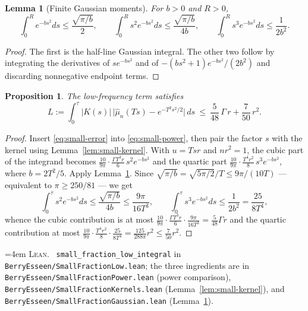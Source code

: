 \documentclass[10pt,a4paper]{article}
\theoremstyle{plain}
\newtheorem{proposition}[theorem]{Proposition}
\newtheorem{lemma}[theorem]{Lemma}
\theoremstyle{definition}
\newcommand{\lean}[1]{\texttt{#1}}
\newcommand{\file}[1]{\texttt{#1}}
\newenvironment{leanref}%
  {\par\addvspace{3pt}\begingroup\sloppy\emergencystretch=4em
   \noindent\footnotesize\textsc{Lean.}\ \ignorespaces}%
  {\par\endgroup\addvspace{3pt}}
\begin{document}
\begin{lemma}[Finite Gaussian moments]\label{lem:gauss-moments}
For $b>0$ and $R>0$,
\[
  \int_0^R e^{-bs^2}ds \le \frac{\sqrt{\pi/b}}{2},
  \qquad
  \int_0^R s^2e^{-bs^2}ds \le \frac{\sqrt{\pi/b}}{4b},
  \qquad
  \int_0^R s^3e^{-bs^2}ds \le \frac{1}{2b^2}.
\]
\end{lemma}

\begin{proof}
The first is the half-line Gaussian integral. The other two follow by
integrating the derivatives of $se^{-bs^2}$ and of
$-(bs^2+1)e^{-bs^2}/(2b^2)$ and discarding nonnegative endpoint terms.
\end{proof}

\begin{proposition}\label{prop:small-low}
The low-frequency term satisfies
\[
  L := \int_0^\tau |K(s)|\,\bigl|\hat\mu_n(Ts)-e^{-T^2s^2/2}\bigr|\,ds
  \ \le\ \frac{5}{48}\,\Gamma\,r + \frac{7}{50}\,r^2 .
\]
\end{proposition}

\begin{proof}
Insert \eqref{eq:small-error} into \eqref{eq:small-power}, then pair the factor
$s$ with the kernel using Lemma~\ref{lem:small-kernel}. With $u=Tsr$ and
$nr^2=1$, the cubic part of the integrand becomes
$\tfrac{10}{9\pi}\cdot\tfrac{\Gamma T^3r}{6}\,s^2e^{-bs^2}$ and the quartic part
$\tfrac{10}{9\pi}\cdot\tfrac{T^4r^2}{8}\,s^3e^{-bs^2}$, where $b=2T^2/5$. Apply
Lemma~\ref{lem:gauss-moments}. Since
$\sqrt{\pi/b}=\sqrt{5\pi/2}/T\le 9\pi/(10T)$ --- equivalent to $\pi\ge250/81$
--- we get
\[
  \int_0^\tau s^2e^{-bs^2}ds \le \frac{\sqrt{\pi/b}}{4b}\le\frac{9\pi}{16T^3},
  \qquad
  \int_0^\tau s^3e^{-bs^2}ds \le \frac1{2b^2} = \frac{25}{8T^4},
\]
whence the cubic contribution is at most
$\tfrac{10}{9\pi}\cdot\tfrac{\Gamma T^3r}{6}\cdot\tfrac{9\pi}{16T^3}
=\tfrac{5}{48}\Gamma r$ and the quartic contribution at most
$\tfrac{10}{9\pi}\cdot\tfrac{T^4r^2}{8}\cdot\tfrac{25}{8T^4}
=\tfrac{125}{288\pi}r^2\le\tfrac{7}{50}r^2$.
\end{proof}

\begin{leanref}
\lean{small\_fraction\_low\_integral} in
\file{BerryEsseen/SmallFractionLow.lean}; the three ingredients are in
\file{BerryEsseen/SmallFractionPower.lean} (power comparison),
\file{BerryEsseen/SmallFractionKernels.lean} (Lemma~\ref{lem:small-kernel}),
and \file{BerryEsseen/SmallFractionGaussian.lean}
(Lemma~\ref{lem:gauss-moments}).
\end{leanref}
\end{document}
